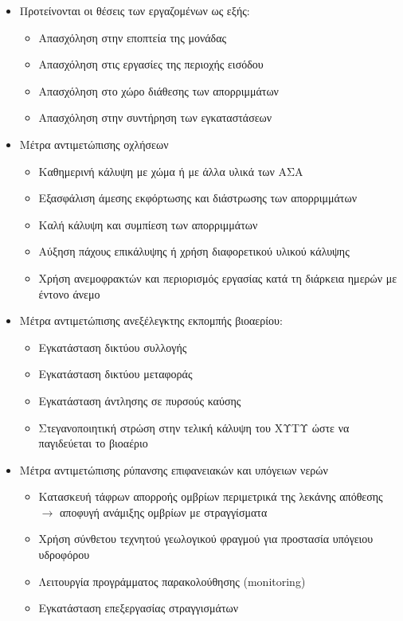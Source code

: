 \documentclass[12pt]{article}
\begin{document}
 	\begin{itemize}
 		\item Προτείνονται οι θέσεις των εργαζομένων ως εξής:
 		\begin{itemize}
	 		\item Απασχόληση στην εποπτεία της μονάδας
	 		\item Απασχόληση στις εργασίες της περιοχής εισόδου
	 		\item Απασχόληση στο χώρο διάθεσης των απορριμμάτων
	 		\item Απασχόληση στην συντήρηση των εγκαταστάσεων
 		\end{itemize}
 		\item Μέτρα αντιμετώπισης οχλήσεων
 		\begin{itemize}
 			\item Καθημερινή κάλυψη με χώμα ή με άλλα υλικά  των ΑΣΑ
 			\item Εξασφάλιση άμεσης εκφόρτωσης και διάστρωσης των απορριμμάτων 
 			\item Καλή κάλυψη και συμπίεση των απορριμμάτων
 			\item Αύξηση πάχους επικάλυψης ή χρήση διαφορετικού υλικού κάλυψης
 			\item Χρήση ανεμοφρακτών και περιορισμός εργασίας κατά τη διάρκεια ημερών με έντονο άνεμο
 		\end{itemize}
 		\item Μέτρα αντιμετώπισης ανεξέλεγκτης εκπομπής βιοαερίου:
 		\begin{itemize}
 			\item Εγκατάσταση δικτύου συλλογής 
 			\item Εγκατάσταση δικτύου μεταφοράς
 			\item Εγκατάσταση άντλησης σε πυρσούς καύσης 
 			\item Στεγανοποιητική στρώση στην τελική κάλυψη του ΧΥΤΥ ώστε να παγιδεύεται το βιοαέριο
 		\end{itemize}
 		\item Μέτρα αντιμετώπισης ρύπανσης επιφανειακών και υπόγειων νερών
 		\begin{itemize}
 			\item Κατασκευή τάφρων απορροής ομβρίων περιμετρικά της λεκάνης απόθεσης $\rightarrow $ αποφυγή ανάμιξης ομβρίων με στραγγίσματα
 			\item Χρήση σύνθετου τεχνητού γεωλογικού φραγμού για προστασία υπόγειου υδροφόρου
 			\item Λειτουργία προγράμματος παρακολούθησης (monitoring)
 			\item Εγκατάσταση επεξεργασίας στραγγισμάτων

\end{itemize}
\end{itemize}
\end{document}
